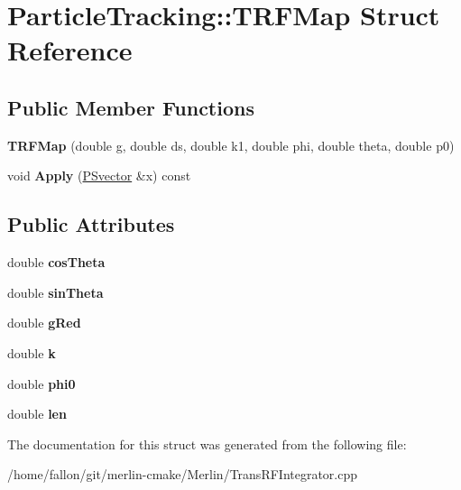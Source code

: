 \hypertarget{structParticleTracking_1_1TRFMap}{}\section{Particle\+Tracking\+:\+:T\+R\+F\+Map Struct Reference}
\label{structParticleTracking_1_1TRFMap}
\subsection*{Public Member Functions}
\begin{DoxyCompactItemize}
\item 
\mbox{\label{structParticleTracking_1_1TRFMap_a38cf191541cabb160d712cf5dc01c1fe}} 
{\bfseries T\+R\+F\+Map} (double g, double ds, double k1, double phi, double theta, double p0)
\item 
\mbox{\label{structParticleTracking_1_1TRFMap_a7761bb5c5429dbb2420e4e73f281384b}} 
void {\bfseries Apply} (\hyperlink{classPSvector}{P\+Svector} \&x) const
\end{DoxyCompactItemize}
\subsection*{Public Attributes}
\begin{DoxyCompactItemize}
\item 
\mbox{\label{structParticleTracking_1_1TRFMap_a8d732dae88283125aacf527d099c0be8}} 
double {\bfseries cos\+Theta}
\item 
\mbox{\label{structParticleTracking_1_1TRFMap_a3a11109047f15de128df45786abd6867}} 
double {\bfseries sin\+Theta}
\item 
\mbox{\label{structParticleTracking_1_1TRFMap_a15d4365720dc3578b35d2c7a85d9a742}} 
double {\bfseries g\+Red}
\item 
\mbox{\label{structParticleTracking_1_1TRFMap_a3f93cf0342bb0ddc27e90309b5a7a30a}} 
double {\bfseries k}
\item 
\mbox{\label{structParticleTracking_1_1TRFMap_adbb126e66606c61b1577dcf83ef623a2}} 
double {\bfseries phi0}
\item 
\mbox{\label{structParticleTracking_1_1TRFMap_a7e433158016a365732b770c13fa587af}} 
double {\bfseries len}
\end{DoxyCompactItemize}


The documentation for this struct was generated from the following file\+:\begin{DoxyCompactItemize}
\item 
/home/fallon/git/merlin-\/cmake/\+Merlin/Trans\+R\+F\+Integrator.\+cpp\end{DoxyCompactItemize}
